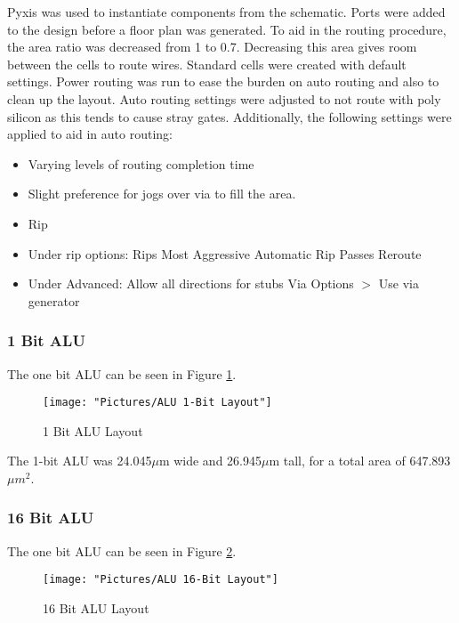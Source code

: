 \documentclass[11pt]{article}
\begin{document}
		Pyxis was used to instantiate components from the schematic. Ports were added to the design before a floor plan was generated. To aid in the routing procedure, the area ratio was decreased from 1 to 0.7. Decreasing this area gives room between the cells to route wires. Standard cells were created with default settings. Power routing was run to ease the burden on auto routing and also to clean up the layout. Auto routing settings were adjusted to not route with poly silicon as this tends to cause stray gates. Additionally, the following settings were applied to aid in auto routing:
		\begin{itemize}
			\item Varying levels of routing completion time
			\item Slight preference for jogs over via to fill the area.
			\item Rip
			\item Under rip options: 
			\subitem Rips Most Aggressive
			\subitem Automatic Rip Passes
			\subitem Reroute
			\item Under Advanced:
			\subitem Allow all directions for stubs
			\subitem Via Options $>$ Use via generator
		\end{itemize}
	
		\subsubsection{1 Bit ALU}
		
			The one bit ALU can be seen in Figure \ref{fig:alu-1bit-layout}.
		
			\begin{figure}[H]
				\centering
				\texttt{[image: "Pictures/ALU 1-Bit Layout"]}
				\caption{1 Bit ALU Layout}
				\label{fig:alu-1bit-layout}
			\end{figure}
			
			The 1-bit ALU was 24.045$\mu$m wide and 26.945$\mu$m tall, for a total area of 647.893$\mu m^2$.
	
		\subsubsection{16 Bit ALU}
		
			The one bit ALU can be seen in Figure \ref{fig:alu-16bit-layout}.
		
			\begin{figure}[H]
				\centering
				\texttt{[image: "Pictures/ALU 16-Bit Layout"]}
				\caption{16 Bit ALU Layout}
				\label{fig:alu-16bit-layout}
			\end{figure}
		
\end{document}
